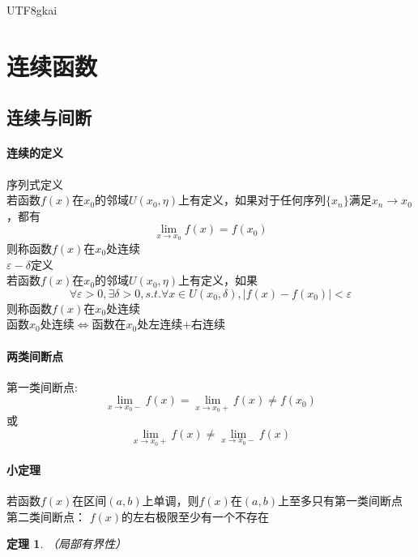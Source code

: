 \documentclass{article}
\newtheorem{theorem}{定理}[subsection]
\begin{document}
\begin{CJK}{UTF8}{gkai}
\section{连续函数}
\subsection{连续与间断}
\paragraph{连续的定义\\}
序列式定义\\
若函数$f(x)$在$x_0$的邻域$U(x_0,\eta)$上有定义，如果对于任何序列$\{x_n\}$满足$x_n\to x_0$，都有\\
\[\lim_{x\to x_0}f(x)=f(x_0)\]
则称函数$f(x)$在$x_0$处连续\\


$\varepsilon-\delta$定义\\
若函数$f(x)$在$x_0$的邻域$U(x_0,\eta)$上有定义，如果\\
\[\forall \varepsilon>0,\exists \delta>0,s.t. \forall x\in U(x_0,\delta),|f(x)-f(x_0)|<\varepsilon\]
则称函数$f(x)$在$x_0$处连续\\

函数$x_0$处连续$\Leftrightarrow$函数在$x_0$处左连续+右连续\\
\paragraph{两类间断点\\}
第一类间断点:
\[\lim_{x\to x_0-}f(x) = \lim_{x\to x_0+} f(x)\neq f(x_0)\]
或\[\lim_{x\to x_0+}f(x)\neq \lim_{x\to x_0-}f(x)\]

\paragraph{小定理\\}
若函数$f(x)$在区间$(a,b)$上单调，则$f(x)$在$(a,b)$上至多只有第一类间断点\\

第二类间断点：
$f(x)$的左右极限至少有一个不存在\\
\begin{theorem}（局部有界性）\\


\end{theorem}
\end{CJK}
\end{document}
